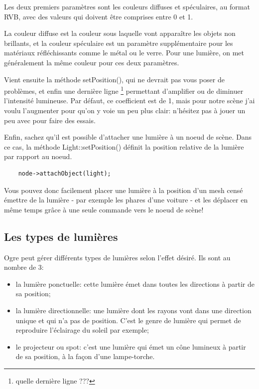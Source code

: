 \documentclass[10pt,a4paper]{report}
\begin{document}
Les deux premiers param\`etres sont les couleurs diffuses et sp\'eculaires, au format RVB, avec des valeurs qui doivent \^etre comprises entre 0 et 1.

La couleur diffuse est la couleur sous laquelle vont appara\^itre les objets non brillants, et la couleur sp\'eculaire est un param\`etre suppl\'ementaire pour les mat\'eriaux r\'efl\'echissants comme le m\'etal ou le verre. Pour une lumi\`ere, on met g\'en\'eralement la m\^eme couleur pour ces deux param\`etres.

Vient ensuite la m\'ethode setPosition(), qui ne devrait pas vous poser de probl\`emes, et enfin une derni\`ere ligne \footnote{quelle derni\`ere ligne ???} permettant d'amplifier ou de diminuer l'intensit\'e lumineuse. Par d\'efaut, ce coefficient est de 1, mais pour notre sc\`ene j'ai voulu l'augmenter pour qu'on y voie un peu plus clair: n'h\'esitez pas \`{a} jouer un peu avec pour faire des essais.

Enfin, sachez qu'il est possible d'attacher une lumi\`ere \`{a} un noeud de sc\`ene. Dans ce cas, la m\'ethode Light::setPosition() d\'efinit la position relative de la lumi\`ere par rapport au noeud.
\begin{lstlisting}
	node->attachObject(light);
\end{lstlisting}


Vous pouvez donc facilement placer une lumi\`ere \`{a} la position d'un mesh cens\'e \'emettre de la lumi\`ere - par exemple les phares d'une voiture - et les d\'eplacer en m\^eme temps gr\^{a}ce \`{a} une seule commande vers le noeud de sc\`ene!





\subsection{Les types de lumi\`eres}

Ogre peut g\'erer diff\'erents types de lumi\`eres selon l'effet d\'esir\'e. Ils sont au nombre de 3:

\begin{itemize}
\item la lumi\`ere ponctuelle: cette lumi\`ere \'emet dans toutes les directions \`{a} partir de sa position;
\item la lumi\`ere directionnelle: une lumi\`ere dont les rayons vont dans une direction unique et qui n'a pas de position. C'est le genre de lumi\`ere qui permet de reproduire l'\'eclairage du soleil par exemple;
\item le projecteur ou spot: c'est une lumi\`ere qui \'emet un c\^one lumineux \`{a} partir de sa position, \`{a} la fa\c{c}on d'une lampe-torche.
\end{itemize}
    
\end{document}
